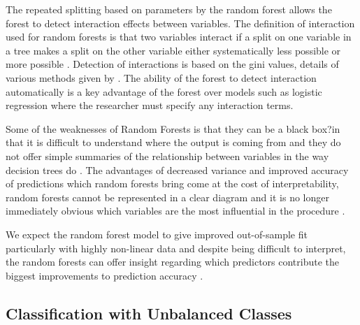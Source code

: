 \documentclass[11pt,a4paper]{article}
\begin{document}
The repeated splitting based on parameters by the random forest allows the forest to detect interaction effects between variables. The definition of interaction used for random forests is that two variables interact if a split on one variable in a tree makes a split on the other variable either systematically less possible or more possible \citep{breiman01}. Detection of interactions is based on the gini values,  details of various methods given by \citet{kelly12}. The ability of the forest to detect interaction automatically is a key advantage of the forest over models such as logistic regression where the researcher must specify any interaction terms.

Some of the weaknesses of Random Forests is that they can be a black box?in that it is difficult to understand where the output is coming from and they do not offer simple summaries of the relationship between variables in the way decision trees do \citep{varian14}. The advantages of decreased variance and improved accuracy of predictions which random forests bring come at the cost of interpretability, random forests cannot be represented in a clear diagram and it is no longer immediately obvious which variables are the most influential in the procedure \citep{james13}.

We expect the random forest model to give improved out-of-sample fit particularly with highly non-linear data and despite being difficult to interpret, the random forests can offer insight regarding which predictors contribute the biggest improvements to prediction accuracy \citep{varian14}.


\subsection{Classification with Unbalanced Classes}
\end{document}
